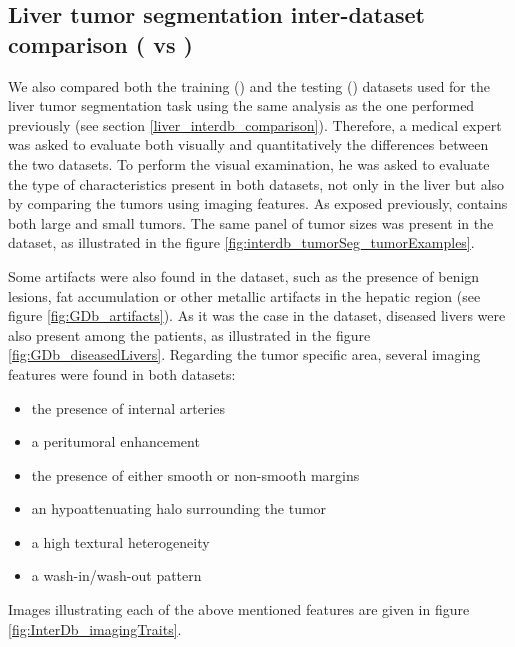 \subsection{Liver tumor segmentation inter-dataset comparison (\textbf{} vs \textbf{})} \label{liver_tumor_interdb_comparison}


We also compared both the training (\textbf{}) and the testing (\textbf{}) datasets used for the liver tumor segmentation task using the same analysis as the one performed previously (see section \ref{liver_interdb_comparison}).
Therefore, a medical expert was asked to evaluate both visually and quantitatively the differences between the two datasets.
To perform the visual examination, he was asked to evaluate the type of characteristics present in both datasets, not only in the liver but also by comparing the tumors using imaging features. 
As exposed previously, \textbf{} contains both large and small tumors. The same panel of tumor sizes was present in the \textbf{} dataset, as illustrated in the figure \ref{fig:interdb_tumorSeg_tumorExamples}.

Some artifacts were also found in the \textbf{} dataset, such as the presence of benign lesions, fat accumulation or other metallic artifacts in the hepatic region (see figure \ref{fig:GDb_artifacts}).
As it was the case in the \textbf{} dataset, diseased livers were also present among the \textbf{} patients, as illustrated in the figure \ref{fig:GDb_diseasedLivers}.
Regarding the tumor specific area, several imaging features were found in both datasets:
\begin{itemize}[itemsep=-0.5em]
\item the presence of internal arteries
\item a peritumoral enhancement
\item the presence of either smooth or non-smooth margins
\item an hypoattenuating halo surrounding the tumor
\item a high textural heterogeneity
\item a wash-in/wash-out pattern 
\end{itemize}
Images illustrating each of the above mentioned features are given in figure \ref{fig:InterDb_imagingTraits}.

